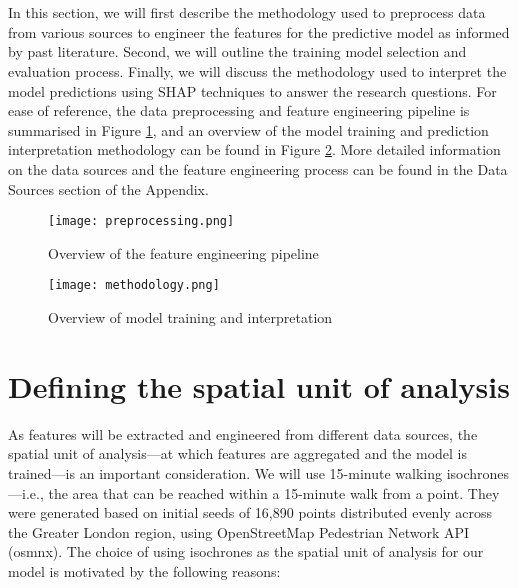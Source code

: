 \section*{}

In this section, we will first describe the methodology used to preprocess data from various sources to engineer the features for the predictive model as informed by past literature. Second, we will outline the training model selection and evaluation process. Finally, we will discuss the methodology used to interpret the model predictions using SHAP techniques to answer the research questions. For ease of reference, the data preprocessing and feature engineering pipeline is summarised in Figure \ref{fig:preprocessing}, and an overview of the model training and prediction interpretation methodology can be found in Figure \ref{fig:methodology}. More detailed information on the data sources and the feature engineering process can be found in the Data Sources section of the Appendix.

\begin{figure}[!ht]
    \centering
    \texttt{[image: preprocessing.png]}
    \caption{Overview of the feature engineering pipeline}
    \label{fig:preprocessing}
\end{figure}

\begin{figure}[!ht]
    \centering
    \texttt{[image: methodology.png]}
    \caption{Overview of model training and interpretation}
    \label{fig:methodology}
\end{figure}

\pagebreak %
\section{Defining the spatial unit of analysis}

As features will be extracted and engineered from different data sources, the spatial unit of analysis---at which features are aggregated and the model is trained---is an important consideration. We will use 15-minute walking isochrones---i.e., the area that can be reached within a 15-minute walk from a point. They were generated based on initial seeds of 16,890 points distributed evenly across the Greater London region, using OpenStreetMap Pedestrian Network API (osmnx). The choice of using isochrones as the spatial unit of analysis for our model is motivated by the following reasons: 

